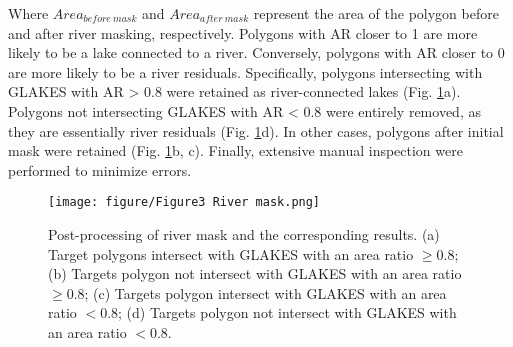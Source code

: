 \documentclass[preprint,12pt,authoryear]{elsarticle}
\begin{document}
Where $Area_{before\ mask}$ and $Area_{after\ mask}$ represent the area of the polygon before and after river masking, respectively. Polygons with AR closer to 1 are more likely to be a lake connected to a river. Conversely, polygons with AR closer to 0 are more likely to be a river residuals. Specifically, polygons intersecting with GLAKES with AR > 0.8 were retained as river-connected lakes (Fig. \ref{fig:Fig3}a). Polygons not intersecting GLAKES with AR < 0.8 were entirely removed, as they are essentially river residuals (Fig. \ref{fig:Fig3}d). In other cases, polygons after initial mask were retained (Fig. \ref{fig:Fig3}b, c). Finally, extensive manual inspection were performed to minimize errors.

\begin{figure}[h]
    \centering
    \texttt{[image: figure/Figure3 River mask.png]}
    \caption{Post-processing of river mask and the corresponding results. (a) Target polygons intersect with GLAKES with an area ratio $\geq$0.8; (b) Targets polygon not intersect with GLAKES with an area ratio $\geq$0.8; (c) Targets polygon intersect with GLAKES with an area ratio $<$0.8; (d) Targets polygon not intersect with GLAKES with an area ratio $<$0.8.}
    \label{fig:Fig3}
\end{figure}
\end{document}
